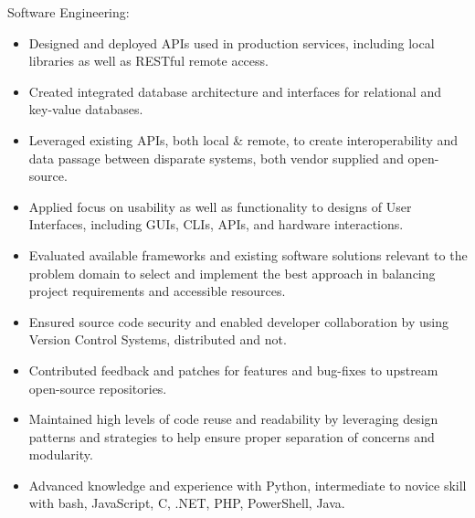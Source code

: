 \documentclass[line,margin]{res}
\begin{document}
\begin{resume}
    Software Engineering:
    \vspace{1 mm}
    \begin{itemize}
        \item Designed and deployed APIs used in production services,
            including local libraries as well as RESTful remote access.
        \item Created integrated database architecture and interfaces for
            relational and key-value databases.
        \item Leveraged existing APIs, both local \& remote, to create
            interoperability and data passage between disparate systems,
            both vendor supplied and open-source.
        \item Applied focus on usability as well as functionality to
            designs of User Interfaces, including GUIs, CLIs, APIs, and
            hardware interactions.
        \item Evaluated available frameworks and existing software
            solutions relevant to the problem domain to select and
            implement the best approach in balancing project requirements
            and accessible resources.
        \item Ensured source code security and enabled developer
            collaboration by using Version Control Systems, distributed
            and not.
        \item Contributed feedback and patches for features and bug-fixes
            to upstream open-source repositories.
        \item Maintained high levels of code reuse and readability by
            leveraging design patterns and strategies to help ensure
            proper separation of concerns and modularity.
        \item Advanced knowledge and experience with Python, intermediate
            to novice skill with bash, JavaScript, C, .NET, PHP, PowerShell,
            Java.
    \end{itemize}


\end{resume}
\end{document}
